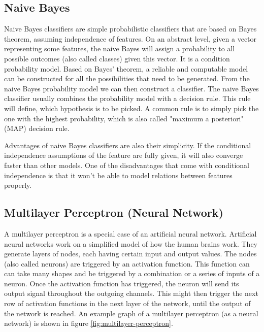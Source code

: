 \subsection{Naive Bayes}
Naive Bayes classifiers are simple probabilistic classifiers that are based on Bayes theorem, assuming independence of features. On an abstract level, given a vector representing some features, the naive Bayes will assign a probability to all possible outcomes (also called classes) given this vector. It is a condition probability model. Based on Bayes' theorem, a reliable and computable model can be constructed for all the possibilities that need to be generated. From the naive Bayes probability model we can then construct a classifier. The naive Bayes classifier usually combines the probability model with a decision rule. This rule will define, which hypothesis is to be picked. A common rule is to simply pick the one with the highest probability, which is also called "maximum a posteriori" (MAP) decision rule.

Advantages of naive Bayes classifiers are also their simplicity. If the conditional independence assumptions of the feature are fully given, it will also converge faster than other models. One of the disadvantages that come with conditional independence is that it won't be able to model relations between features properly. 


\subsection{Multilayer Perceptron (Neural Network)}
A multilayer perceptron is a special case of an artificial neural network. Artificial neural networks work on a simplified model of how the human brains work. They generate layers of nodes, each having certain input and output values. The nodes (also called neurons) are triggered by an activation function. This function can can take many shapes and be triggered by a combination or a series of inputs of a neuron. Once the activation function has triggered, the neuron will send its output signal throughout the outgoing channels. This might then trigger the next row of activation functions in the next layer of the network, until the output of the network is reached. An example graph of a multilayer perceptron (as a neural network) is shown in figure \ref{fig:multilayer-perceptron}.

